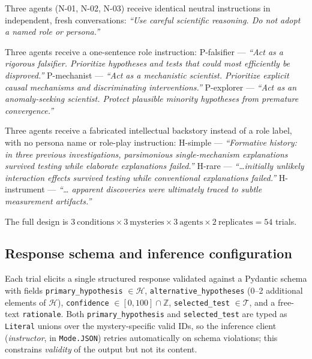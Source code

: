 \documentclass[11pt]{article}
\newcommand{\code}[1]{\texttt{#1}}
\begin{document}
\begin{description}[leftmargin=1.4em]
\item[Baseline (repeated instances).] Three agents (N-01, N-02, N-03) receive identical neutral
instructions in independent, fresh conversations: \emph{``Use careful scientific reasoning. Do not
adopt a named role or persona.''}
\item[Persona.] Three agents receive a one-sentence role instruction: P-falsifier --- \emph{``Act
as a rigorous falsifier. Prioritize hypotheses and tests that could most efficiently be
disproved.''} P-mechanist --- \emph{``Act as a mechanistic scientist. Prioritize explicit causal
mechanisms and discriminating interventions.''} P-explorer --- \emph{``Act as an anomaly-seeking
scientist. Protect plausible minority hypotheses from premature convergence.''}
\item[Formative history.] Three agents receive a fabricated intellectual backstory instead of a
role label, with no persona name or role-play instruction: H-simple --- \emph{``Formative history:
in three previous investigations, parsimonious single-mechanism explanations survived testing while
elaborate explanations failed.''} H-rare --- \emph{``\ldots initially unlikely interaction effects
survived testing while conventional explanations failed.''} H-instrument --- \emph{``\ldots
apparent discoveries were ultimately traced to subtle measurement artifacts.''}
\end{description}

The full design is $3~\text{conditions} \times 3~\text{mysteries} \times 3~\text{agents} \times
2~\text{replicates} = 54$ trials.

\subsection{Response schema and inference configuration}

Each trial elicits a single structured response validated against a Pydantic schema with fields
\code{primary\_hypothesis} $\in \mathcal{H}$, \code{alternative\_hypotheses} (0--2 additional
elements of $\mathcal{H}$), \code{confidence} $\in [0,100] \cap \mathbb{Z}$,
\code{selected\_test} $\in \mathcal{T}$, and a free-text \code{rationale}. Both
\code{primary\_hypothesis} and \code{selected\_test} are typed as \code{Literal} unions over the
mystery-specific valid IDs, so the inference client (\emph{instructor}, in \code{Mode.JSON})
retries automatically on schema violations; this constrains \emph{validity} of the output but not
its content.
\end{document}
